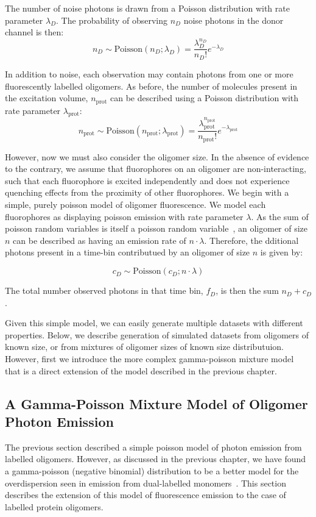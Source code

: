 The number of noise photons is drawn from a Poisson distribution with rate parameter $\lambda_D$. The probability of observing $n_D$ noise photons in the donor channel is then:
\begin{equation}
n_{D} \sim \text{Poisson}(n_{D}; \lambda_{D}) = \frac{\lambda_{D}^{n_{D}}}{n_{D}!}e^{-\lambda_{D}}
\end{equation}

In addition to noise, each observation may contain photons from one or more fluorescently labelled oligomers.  As before, the number of molecules present in the excitation volume, $n_{\text{prot}}$ can be described using a Poisson distribution with rate parameter $\lambda_{\text{prot}}$:
\begin{equation}
n_{\text{prot}} \sim \text{Poisson}(n_{\text{prot}}; \lambda_{\text{prot}}) = \frac{\lambda_{\text{prot}}^{n_{\text{prot}}}}{n_{\text{prot}}!}e^{-\lambda_{\text{prot}}}
\label{eq:nprot}
\end{equation}

However, now we must also consider the oligomer size. In the absence of evidence to the contrary, we assume that fluorophores on an oligomer are non-interacting, such that each fluorophore is excited independently and does not experience quenching effects from the proximity of other fluorophores. We begin with a simple, purely poisson model of oligomer fluorescence. We model each fluorophores as displaying poisson emission with rate parameter $\lambda$. As the sum of poisson random variables is itself a poisson random variable~\cite{???}, an oligomer of size $n$ can be described as having an emission rate of $n \cdot \lambda$. Therefore, the dditional photons present in a time-bin contributued by an oligomer of size $n$ is given by:

\begin{equation}
c_D \sim \text{Poisson}(c_D; n \cdot \lambda)
\end{equation} 

The total number observed photons in that time bin, $f_D$, is then the sum $n_D + c_D$.

Given this simple model, we can easily generate multiple datasets with different properties. Below, we describe generation of simulated datasets from oligomers of known size, or from mixtures of oligomer sizes of known size distributuion. However, first we introduce the more complex gamma-poisson mixture model that is a direct extension of the model described in the previous chapter.

\subsection{A Gamma-Poisson Mixture Model of Oligomer Photon Emission}
The previous section described a simple poisson model of photon emission from labelled oligomers. However, as discussed in the previous chapter, we have found a gamma-poisson (negative binomial) distribution to be a better model for the overdispersion seen in emission from dual-labelled monomers~\cite{murphy14}. This section describes the extension of this model of fluorescence emission to the case of labelled protein oligomers.

